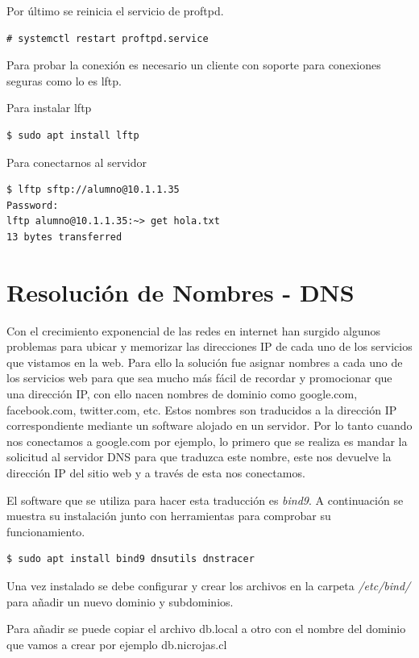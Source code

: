 \documentclass[12pt]{article}
\begin{document}
Por último se reinicia el servicio de proftpd.
\begin{lstlisting}[frame=single]
# systemctl restart proftpd.service
\end{lstlisting}

Para probar la conexión es necesario un cliente con soporte para conexiones seguras como lo es lftp.

Para instalar lftp
\begin{lstlisting}[frame=single]
$ sudo apt install lftp
\end{lstlisting}

Para conectarnos al servidor 
\begin{lstlisting}[frame=single]
$ lftp sftp://alumno@10.1.1.35
Password:
lftp alumno@10.1.1.35:~> get hola.txt
13 bytes transferred
\end{lstlisting}

\section{Resolución de Nombres - DNS}

Con el crecimiento exponencial de las redes en internet han surgido algunos problemas para ubicar y memorizar las direcciones IP de cada uno de los servicios que vistamos en la web. Para ello la solución fue asignar nombres a cada uno de los servicios web para que sea mucho más fácil de recordar y promocionar que una dirección IP, con ello nacen nombres de dominio como google.com, facebook.com, twitter.com, etc. Estos nombres son traducidos a la dirección IP correspondiente mediante un software alojado en un servidor. Por lo tanto cuando nos conectamos a google.com por ejemplo, lo primero que se realiza es mandar la solicitud al servidor DNS para que traduzca este nombre, este nos devuelve la dirección IP del sitio web y a través de esta nos conectamos.  

El software que se utiliza para hacer esta traducción es \emph{bind9}. A continuación se muestra su instalación junto con herramientas para comprobar su funcionamiento.

\begin{lstlisting}[frame=single]
$ sudo apt install bind9 dnsutils dnstracer 
\end{lstlisting}

Una vez instalado se debe configurar y crear los archivos en la carpeta \emph{/etc/bind/} para añadir un nuevo dominio y subdominios.

Para añadir se puede copiar el archivo db.local a otro con el nombre del dominio que vamos a crear por ejemplo db.nicrojas.cl
\end{document}
